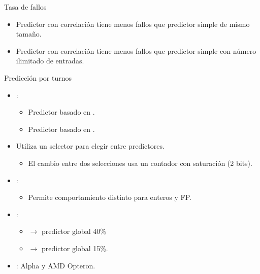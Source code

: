 \begin{frame}[t]{Tasa de fallos}
\begin{itemize}
  \item Predictor con correlación tiene menos fallos que predictor simple de mismo tamaño.
  \item Predictor con correlación tiene menos fallos que predictor simple con número ilimitado de entradas.
\end{itemize}

\end{frame}


\begin{frame}[t]{Predicción por turnos}
\begin{itemize}
  \item {}:
    \begin{itemize}
      \item Predictor basado en .
      \item Predictor basado en .
    \end{itemize}
  \item Utiliza un selector para elegir entre predictores.
    \begin{itemize}
      \item El cambio entre dos selecciones usa un contador con saturación (2 bits).
    \end{itemize}
  \item {}:
    \begin{itemize}
      \item Permite comportamiento distinto para enteros y FP.
    \end{itemize}
  \item {}:
    \begin{itemize}
      \item {} $\rightarrow$ predictor global 40\%
      \item {} $\rightarrow$ predictor global 15\%.
    \end{itemize}
  \item {}: Alpha y AMD Opteron.
\end{itemize}
\end{frame}


